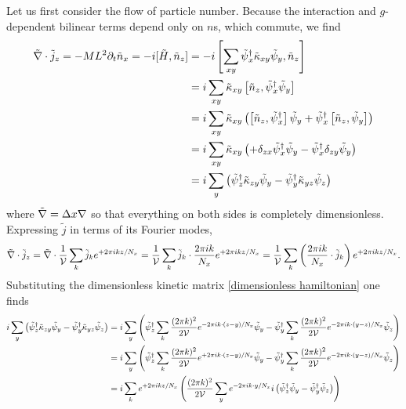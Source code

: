 Let us first consider the flow of particle number.
Because the interaction and $g$-dependent bilinear terms depend only on $n$s, which commute, we find
\begin{align}
	\tilde{\nabla}\cdot\tilde{j}_z = -ML^2 \partial_t \tilde{n}_x = -i[\tilde{H}, \tilde{n}_z]
	&=
		-i \left[
			\sum_{xy} \tilde{\psi}{}^{\dagger}_x \tilde{\kappa}_{xy} \tilde{\psi}_y,
		\tilde{n}_z\right]
	\nonumber\\
	&=
		i \sum_{xy} \tilde{\kappa}_{xy} \left[ \tilde{n}_z, \tilde{\psi}{}^{\dagger}_x \tilde{\psi}_y\right]
	\nonumber\\
	&=
		i \sum_{xy} \tilde{\kappa}_{xy} \left(
			\left[ \tilde{n}_z, \tilde{\psi}{}^{\dagger}_x \right]\tilde{\psi}_y
			+
			\tilde{\psi}{}^{\dagger}_x \left[ \tilde{n}_z, \tilde{\psi}_y\right]
		\right)
	\nonumber\\
	&=
		i \sum_{xy} \tilde{\kappa}_{xy} \left(
			+ \delta_{zx} \tilde{\psi}{}^{\dagger}_x \tilde{\psi}_y
			-
			\tilde{\psi}{}^{\dagger}_x \delta_{zy} \tilde{\psi}_y
		\right)
	\nonumber\\
	&=
		i \sum_{y} \left(
			\tilde{\psi}{}^{\dagger}_z \tilde{\kappa}_{zy} \tilde{\psi}_y
		-	\tilde{\psi}{}^{\dagger}_y \tilde{\kappa}_{yz} \tilde{\psi}_z
		\right)
\end{align}
where $\tilde{\nabla} = \Delta x \nabla$ so that everything on both sides is completely dimensionless.
Expressing $\tilde{j}$ in terms of its Fourier modes,
\begin{align}
	\tilde{\nabla}\cdot \tilde{j}_z
	=
	\tilde{\nabla} \cdot \frac{1}{\mathcal{V}}\sum_k \tilde{j}_k e^{+2\pi i k z/N_x}
	=
	\frac{1}{\mathcal{V}}\sum_k \tilde{j}_k \cdot \frac{2\pi i k}{N_x} e^{+2\pi i k z/N_x}
	=
	\frac{1}{\mathcal{V}}\sum_k \left( \frac{2\pi i k}{N_x} \cdot \tilde{j}_k \right) e^{+2\pi i k z/N_x}.
	\label{eq:divergence of j}
\end{align}
Substituting the dimensionless kinetic matrix \eqref{dimensionless hamiltonian} one finds
\begin{align}
	i \sum_{y} \left(
		\tilde{\psi}{}^{\dagger}_z \tilde{\kappa}_{zy} \tilde{\psi}_y
	-	\tilde{\psi}{}^{\dagger}_y \tilde{\kappa}_{yz} \tilde{\psi}_z
	\right)
	&=
	i \sum_{y} \left(
		\tilde{\psi}{}^{\dagger}_z \sum_{k} \frac{(2\pi k)^2}{2 \mathcal{V}} e^{-2\pi i k \cdot(z-y)/N_x} \tilde{\psi}_y
	-	\tilde{\psi}{}^{\dagger}_y \sum_{k} \frac{(2\pi k)^2}{2 \mathcal{V}} e^{-2\pi i k \cdot(y-z)/N_x} \tilde{\psi}_z
	\right)
	\nonumber\\
	&=
	i \sum_{y} \left(
		\tilde{\psi}{}^{\dagger}_z \sum_{k} \frac{(2\pi k)^2}{2 \mathcal{V}} e^{+2\pi i k \cdot(z-y)/N_x} \tilde{\psi}_y
	-	\tilde{\psi}{}^{\dagger}_y \sum_{k} \frac{(2\pi k)^2}{2 \mathcal{V}} e^{-2\pi i k \cdot(y-z)/N_x} \tilde{\psi}_z
	\right)
	\nonumber\\
	&=
	i\sum_k e^{+2\pi i k z / N_x}\left(
		\frac{(2\pi k)^2}{2\mathcal{V}} \sum_y e^{-2\pi i k \cdot y / N_x} i \left(\tilde{\psi}{}^{\dagger}_z \tilde{\psi}_y  - \tilde{\psi}{}^{\dagger}_y \tilde{\psi}_z \right)
	\right)
	\label{eq:current operator intermediate}
\end{align}
